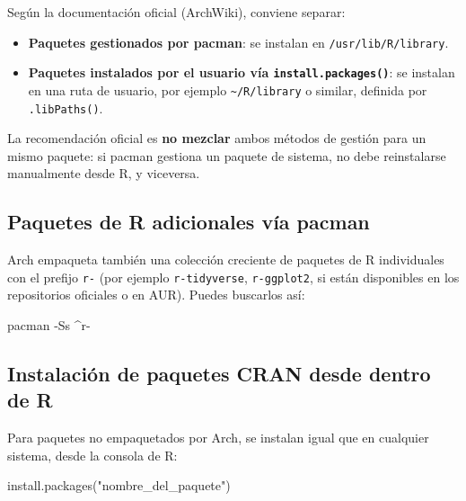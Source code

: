 \documentclass[
  man,
  floatsintext,
  longtable,
  a4paper,
  nolmodern,
  notxfonts,
  notimes,
  12pt,
  colorlinks=true,linkcolor=blue,citecolor=blue,urlcolor=blue]{apa7}
\newenvironment{Shaded}{\begin{snugshade}}{\end{snugshade}}
\newcommand{\AttributeTok}[1]{\textcolor[rgb]{0.40,0.45,0.13}{#1}}
\newcommand{\ExtensionTok}[1]{\textcolor[rgb]{0.00,0.23,0.31}{#1}}
\newcommand{\FunctionTok}[1]{\textcolor[rgb]{0.28,0.35,0.67}{#1}}
\newcommand{\NormalTok}[1]{\textcolor[rgb]{0.00,0.23,0.31}{#1}}
\newcommand{\StringTok}[1]{\textcolor[rgb]{0.13,0.47,0.30}{#1}}
\providecommand{\tightlist}{%
  \setlength{\itemsep}{0pt}\setlength{\parskip}{0pt}}
\begin{document}
Según la documentación oficial (ArchWiki), conviene separar:

\begin{itemize}
\tightlist
\item
  \textbf{Paquetes gestionados por pacman}: se instalan en
  \texttt{/usr/lib/R/library}.
\item
  \textbf{Paquetes instalados por el usuario vía
  \texttt{install.packages()}}: se instalan en una ruta de usuario, por
  ejemplo \texttt{\textasciitilde{}/R/library} o similar, definida por
  \texttt{.libPaths()}.
\end{itemize}

La recomendación oficial es \textbf{no mezclar} ambos métodos de gestión
para un mismo paquete: si pacman gestiona un paquete de sistema, no debe
reinstalarse manualmente desde R, y viceversa.

\subsection{Paquetes de R adicionales vía
pacman}\label{paquetes-de-r-adicionales-vuxeda-pacman}

Arch empaqueta también una colección creciente de paquetes de R
individuales con el prefijo \texttt{r-} (por ejemplo
\texttt{r-tidyverse}, \texttt{r-ggplot2}, si están disponibles en los
repositorios oficiales o en AUR). Puedes buscarlos así:

\begin{Shaded}
\begin{Highlighting}[]
\ExtensionTok{pacman} \AttributeTok{{-}Ss}\NormalTok{ \^{}r{-}}
\end{Highlighting}
\end{Shaded}

\subsection{Instalación de paquetes CRAN desde dentro de
R}\label{instalaciuxf3n-de-paquetes-cran-desde-dentro-de-r}

Para paquetes no empaquetados por Arch, se instalan igual que en
cualquier sistema, desde la consola de R:

\begin{Shaded}
\begin{Highlighting}[]
\FunctionTok{install.packages}\NormalTok{(}\StringTok{"nombre\_del\_paquete"}\NormalTok{)}
\end{Highlighting}
\end{Shaded}
\end{document}
